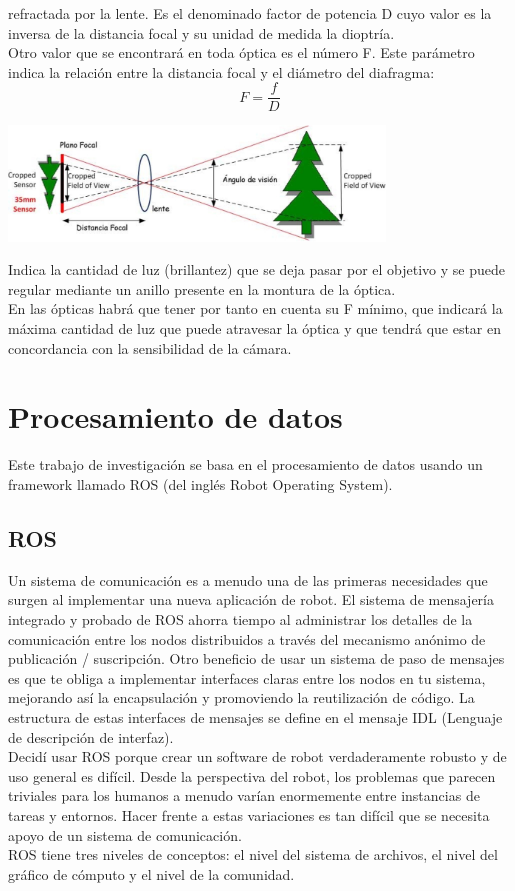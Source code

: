 refractada por la lente. Es el denominado factor de potencia D cuyo valor es la inversa
de la distancia focal y su unidad de medida la dioptría.\\
Otro valor que se encontrará en toda óptica es el número F. Este parámetro
indica la relación entre la distancia focal y el diámetro del diafragma:
\begin{equation}
    F = \frac{f}{D}    
\end{equation}
\begin{center}
    \includegraphics[width=0.75\textwidth]{Capitulo2/Fig1_4.eps}       
    \label{Fig1_4}
\end{center}
Indica la cantidad de luz (brillantez) que se deja pasar por el objetivo y se puede regular 
mediante un anillo presente en la montura de la óptica.\\
En las ópticas habrá que tener por
tanto en cuenta su F mínimo, que indicará la máxima cantidad de luz que puede
atravesar la óptica y que tendrá que estar en concordancia con la sensibilidad de la
cámara.


\section{Procesamiento de datos}
Este trabajo de investigación se basa en el procesamiento de datos usando un framework
llamado ROS (del inglés Robot Operating System).
\subsection{ROS}
Un sistema de comunicación es a menudo una de las primeras necesidades que surgen al 
implementar una nueva aplicación de robot. El sistema de mensajería integrado y 
probado de ROS ahorra tiempo al administrar los detalles de la comunicación entre 
los nodos distribuidos a través del mecanismo anónimo de publicación / suscripción. 
Otro beneficio de usar un sistema de paso de mensajes es que te obliga a implementar 
interfaces claras entre los nodos en tu sistema, mejorando así la encapsulación y 
promoviendo la reutilización de código. La estructura de estas interfaces de mensajes 
se define en el mensaje IDL (Lenguaje de descripción de interfaz).\\
Decidí usar ROS porque crear un software de robot verdaderamente robusto y de uso 
general es difícil. Desde la perspectiva del robot, los problemas que parecen triviales
para los humanos a menudo varían enormemente entre instancias de tareas y entornos. 
Hacer frente a estas variaciones es tan difícil que se necesita apoyo de un sistema
de comunicación.\\
ROS tiene tres niveles de conceptos: el nivel del sistema de archivos, el nivel del gráfico 
de cómputo y el nivel de la comunidad. ~\cite{ROS}
